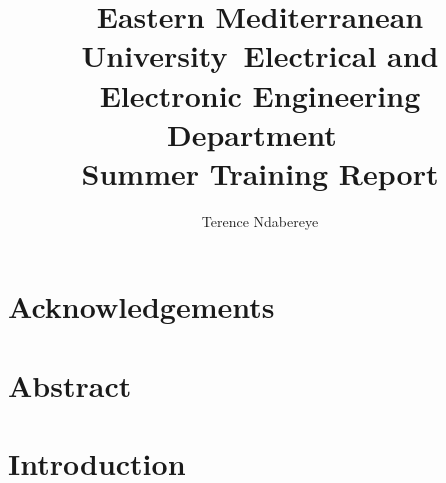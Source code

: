 \documentclass[a4paper, 12pt]{report}
\title{
	Eastern Mediterranean University\
	Electrical and Electronic Engineering Department\
	\\
	Summer Training Report
}
\author{Terence Ndabereye}
\begin{document}
\maketitle

\chapter*{Acknowledgements}
\newpage

\tableofcontents
\newpage

\listoffigures
\newpage

\listoftables
\newpage

\chapter*{Abstract}
\newpage

\chapter{Introduction}
\end{document}
